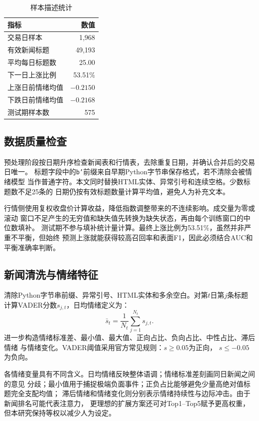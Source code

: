 \documentclass[UTF8,a4paper,10pt,twocolumn,fontset=none]{ctexart}
\begin{document}
\begin{table}[t]
\centering
\caption{样本描述统计}
\small
\begin{tabular}{lr}
\toprule
指标 & 数值\\
\midrule
交易日样本 & 1,968\\
有效新闻标题 & 49,193\\
平均每日标题数 & 25.00\\
下一日上涨比例 & 53.51\%\\
上涨日前情绪均值 & $-0.2150$\\
下跌日前情绪均值 & $-0.2168$\\
测试期样本数 & 575\\
\bottomrule
\end{tabular}
\label{tab:sample}
\end{table}

\subsection{数据质量检查}

预处理阶段按日期升序检查新闻表和行情表，去除重复日期，并确认合并后的交易日唯一。
标题字段中的\texttt{b'}前缀来自早期Python字节串保存格式，若不清除会被情绪模型
当作普通字符。本文同时替换HTML实体、异常引号和连续空格。少数标题数不足25条的
日期仍按有效标题数量计算平均值，避免人为补充文本。

行情侧使用复权收盘价计算收益，降低指数调整带来的不连续影响。成交量为零或滚动
窗口不足产生的无穷值和缺失值先转换为缺失状态，再由每个训练窗口的中位数填补。
测试期不参与填补统计量计算。最终上涨比例为53.51\%，虽然并非严重不平衡，但始终
预测上涨就能获得较高召回率和表面F1，因此必须结合AUC和平衡准确率判断。

\subsection{新闻清洗与情绪特征}

清除Python字节串前缀、异常引号、HTML实体和多余空白。对第$t$日第$j$条标题
计算VADER分数$s_{j,t}$，日均情绪定义为：
\begin{equation}
\bar{s}_t=\frac{1}{N_t}\sum_{j=1}^{N_t}s_{j,t}.
\end{equation}
进一步构造情绪标准差、最小值、最大值、正向占比、负向占比、中性占比、滞后情绪
与情绪变化。VADER阈值采用官方常见规则：$s\geq0.05$为正向，
$s\leq-0.05$为负向。

各情绪变量具有不同含义。日均情绪反映整体语调；情绪标准差刻画同日新闻之间的意见
分歧；最小值用于捕捉极端负面事件；正负占比能够避免少量高绝对值标题完全支配均值；
滞后情绪和情绪变化则分别表示情绪持续性与边际冲击。由于新闻排名可能代表注意力，
更理想的扩展方案还可对Top1--Top5赋予更高权重，但本研究保持等权以减少人为设定。
\end{document}

